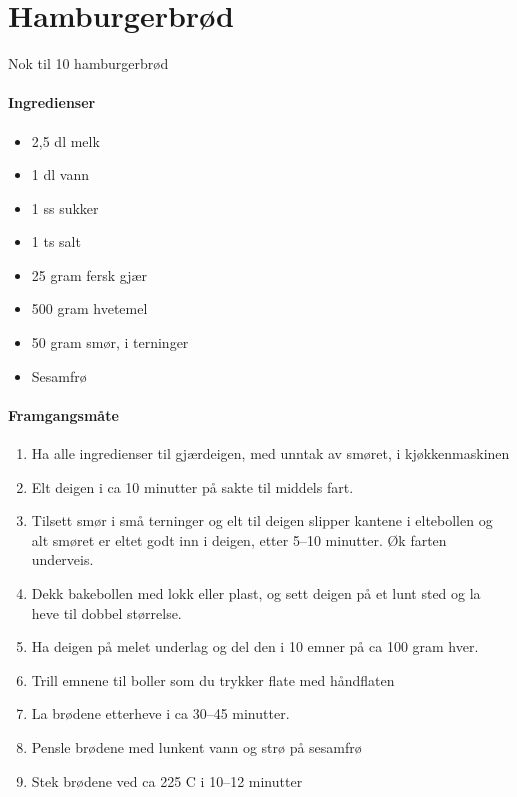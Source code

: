 \section{﻿Hamburgerbrød}
Nok til 10 hamburgerbrød

\paragraph{Ingredienser}
\begin{itemize}[noitemsep]
		\item 2,5 dl melk
		\item 1 dl vann
		\item 1 ss sukker
		\item 1 ts salt
		\item 25 gram fersk gjær
		\item 500 gram hvetemel
		\item 50 gram smør, i terninger
		\item Sesamfrø
\end{itemize}

\paragraph{Framgangsmåte}
\begin{enumerate}[noitemsep]
	\item Ha alle ingredienser til gjærdeigen, med unntak av smøret, i kjøkkenmaskinen
	\item Elt deigen i ca 10 minutter på sakte til middels fart.
	\item Tilsett smør i små terninger og elt til deigen slipper kantene i eltebollen og alt smøret er eltet godt inn i deigen, etter 5--10 minutter. Øk farten underveis.
	\item Dekk bakebollen med lokk eller plast, og sett deigen på et lunt sted og la heve til dobbel størrelse.
	\item Ha deigen på melet underlag og del den i 10 emner på ca 100 gram hver.
	\item Trill emnene til boller som du trykker flate med håndflaten
	\item La brødene etterheve i ca 30--45 minutter.
	\item Pensle brødene med lunkent vann og strø på sesamfrø
	\item Stek brødene ved ca 225 \degree C i 10--12 minutter
\end{enumerate}
